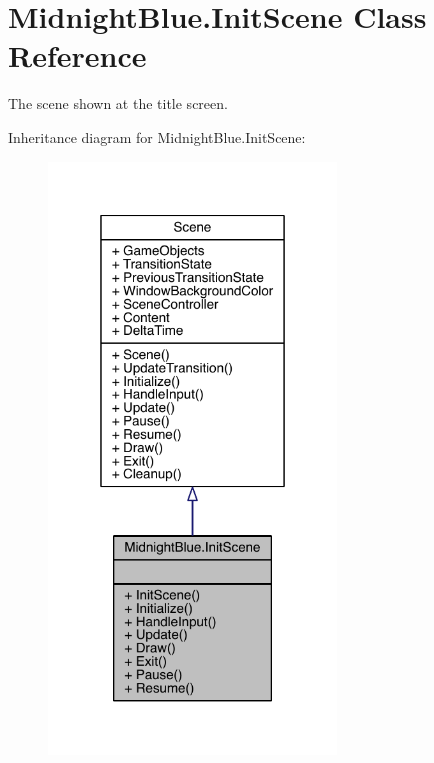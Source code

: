 \hypertarget{class_midnight_blue_1_1_init_scene}{}\section{Midnight\+Blue.\+Init\+Scene Class Reference}
\label{class_midnight_blue_1_1_init_scene}


The scene shown at the title screen.  




Inheritance diagram for Midnight\+Blue.\+Init\+Scene\+:\nopagebreak
\begin{figure}[H]
\begin{center}
\leavevmode
\includegraphics[width=217pt]{class_midnight_blue_1_1_init_scene__inherit__graph}
\end{center}
\end{figure}


